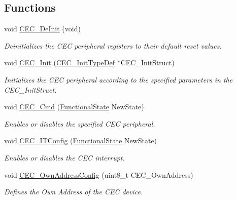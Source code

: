 \subsection*{Functions}
\begin{DoxyCompactItemize}
\item 
void \hyperlink{group___c_e_c___exported___functions_ga604c3b15b51a46303c201fa3deac2212}{C\+E\+C\+\_\+\+De\+Init} (void)
\begin{DoxyCompactList}\small\item\em Deinitializes the C\+EC peripheral registers to their default reset values. \end{DoxyCompactList}\item 
void \hyperlink{group___c_e_c___exported___functions_gaf48aee745a16370372b3eaa7cf3ed22b}{C\+E\+C\+\_\+\+Init} (\hyperlink{struct_c_e_c___init_type_def}{C\+E\+C\+\_\+\+Init\+Type\+Def} $\ast$C\+E\+C\+\_\+\+Init\+Struct)
\begin{DoxyCompactList}\small\item\em Initializes the C\+EC peripheral according to the specified parameters in the C\+E\+C\+\_\+\+Init\+Struct. \end{DoxyCompactList}\item 
void \hyperlink{group___c_e_c___exported___functions_ga0c8efa79e5768930e567b3b3ed6e09e9}{C\+E\+C\+\_\+\+Cmd} (\hyperlink{group___exported__types_gac9a7e9a35d2513ec15c3b537aaa4fba1}{Functional\+State} New\+State)
\begin{DoxyCompactList}\small\item\em Enables or disables the specified C\+EC peripheral. \end{DoxyCompactList}\item 
void \hyperlink{group___c_e_c___exported___functions_ga8be87c514505cf82eb29334f054fc0bc}{C\+E\+C\+\_\+\+I\+T\+Config} (\hyperlink{group___exported__types_gac9a7e9a35d2513ec15c3b537aaa4fba1}{Functional\+State} New\+State)
\begin{DoxyCompactList}\small\item\em Enables or disables the C\+EC interrupt. \end{DoxyCompactList}\item 
void \hyperlink{group___c_e_c___exported___functions_gacad422ef1f50246b2021b41835b8a95c}{C\+E\+C\+\_\+\+Own\+Address\+Config} (uint8\+\_\+t C\+E\+C\+\_\+\+Own\+Address)
\begin{DoxyCompactList}\small\item\em Defines the Own Address of the C\+EC device. \end{DoxyCompactList}\item 

\end{DoxyCompactItemize}
